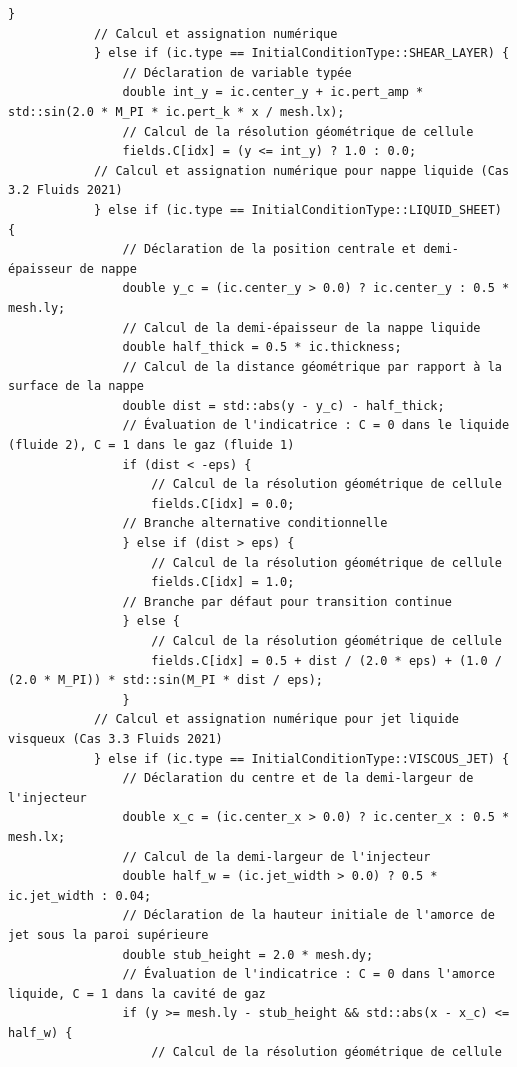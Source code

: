 \documentclass[10pt,a4paper,oneside]{book}
\begin{document}
\begin{lstlisting}[language={[11]C++}]
                }
            // Calcul et assignation numérique
            } else if (ic.type == InitialConditionType::SHEAR_LAYER) {
                // Déclaration de variable typée
                double int_y = ic.center_y + ic.pert_amp * std::sin(2.0 * M_PI * ic.pert_k * x / mesh.lx);
                // Calcul de la résolution géométrique de cellule
                fields.C[idx] = (y <= int_y) ? 1.0 : 0.0;
            // Calcul et assignation numérique pour nappe liquide (Cas 3.2 Fluids 2021)
            } else if (ic.type == InitialConditionType::LIQUID_SHEET) {
                // Déclaration de la position centrale et demi-épaisseur de nappe
                double y_c = (ic.center_y > 0.0) ? ic.center_y : 0.5 * mesh.ly;
                // Calcul de la demi-épaisseur de la nappe liquide
                double half_thick = 0.5 * ic.thickness;
                // Calcul de la distance géométrique par rapport à la surface de la nappe
                double dist = std::abs(y - y_c) - half_thick;
                // Évaluation de l'indicatrice : C = 0 dans le liquide (fluide 2), C = 1 dans le gaz (fluide 1)
                if (dist < -eps) {
                    // Calcul de la résolution géométrique de cellule
                    fields.C[idx] = 0.0;
                // Branche alternative conditionnelle
                } else if (dist > eps) {
                    // Calcul de la résolution géométrique de cellule
                    fields.C[idx] = 1.0;
                // Branche par défaut pour transition continue
                } else {
                    // Calcul de la résolution géométrique de cellule
                    fields.C[idx] = 0.5 + dist / (2.0 * eps) + (1.0 / (2.0 * M_PI)) * std::sin(M_PI * dist / eps);
                }
            // Calcul et assignation numérique pour jet liquide visqueux (Cas 3.3 Fluids 2021)
            } else if (ic.type == InitialConditionType::VISCOUS_JET) {
                // Déclaration du centre et de la demi-largeur de l'injecteur
                double x_c = (ic.center_x > 0.0) ? ic.center_x : 0.5 * mesh.lx;
                // Calcul de la demi-largeur de l'injecteur
                double half_w = (ic.jet_width > 0.0) ? 0.5 * ic.jet_width : 0.04;
                // Déclaration de la hauteur initiale de l'amorce de jet sous la paroi supérieure
                double stub_height = 2.0 * mesh.dy;
                // Évaluation de l'indicatrice : C = 0 dans l'amorce liquide, C = 1 dans la cavité de gaz
                if (y >= mesh.ly - stub_height && std::abs(x - x_c) <= half_w) {
                    // Calcul de la résolution géométrique de cellule

\end{lstlisting}
\end{document}
